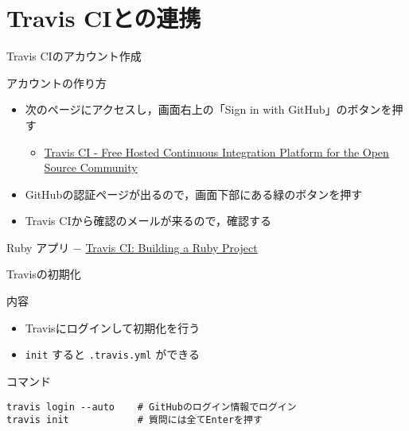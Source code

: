 \documentclass[t, aspectratio=169]{beamer}
\begin{document}
\section{Travis CIとの連携}
\label{sec-7-3}
\begin{frame}[label=sec-7-3-1]{Travis CIのアカウント作成}
\begin{block}{アカウントの作り方}
\begin{itemize}
\item 次のページにアクセスし，画面右上の「Sign in with GitHub」のボタンを押す
\begin{itemize}
\item \href{https://travis-ci.org/}{Travis CI - Free Hosted Continuous Integration Platform for the Open Source Community}
\end{itemize}
\item GitHubの認証ページが出るので，画面下部にある緑のボタンを押す
\item Travis CIから確認のメールが来るので，確認する
\end{itemize}
\end{block}

\begin{block}{Ruby アプリ}
− \href{http://docs.travis-ci.com/user/languages/ruby/}{Travis CI: Building a Ruby Project}
\end{block}
\end{frame}
\begin{frame}[fragile,label=sec-7-3-2]{Travisの初期化}
 \begin{block}{内容}
\begin{itemize}
\item Travisにログインして初期化を行う
\end{itemize}
\begin{itemize}
\item \texttt{init} すると \texttt{.travis.yml} ができる
\end{itemize}
\end{block}

\begin{block}{コマンド}

\begin{verbatim}
travis login --auto    # GitHubのログイン情報でログイン
travis init            # 質問には全てEnterを押す
\end{verbatim}
\end{block}
\end{frame}
\end{document}
